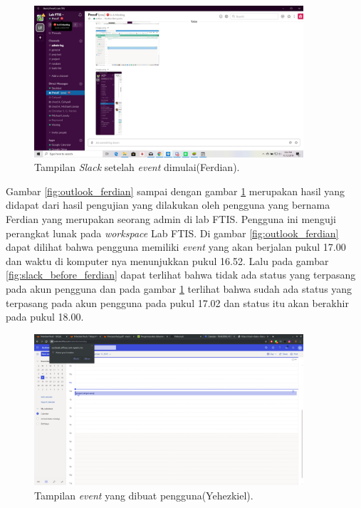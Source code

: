\begin{figure}[h]
  \includegraphics[width=10cm]{./Gambar/PengujianFerdian/Slack_After.jpg}
  \centering
  \caption{Tampilan \textit{Slack} setelah \textit{event} dimulai(Ferdian).}
  \label{fig:slack_after_ferdian}
\end{figure}

Gambar \ref{fig:outlook_ferdian} sampai dengan gambar \ref{fig:slack_after_ferdian} merupakan hasil yang didapat dari hasil pengujian yang dilakukan oleh pengguna yang bernama Ferdian yang merupakan seorang admin di lab FTIS. Pengguna ini menguji perangkat lunak pada \textit{workspace} Lab FTIS. Di gambar \ref{fig:outlook_ferdian} dapat dilihat bahwa pengguna memiliki \textit{event} yang akan berjalan pukul 17.00 dan waktu di komputer nya menunjukkan pukul 16.52. Lalu pada gambar \ref{fig:slack_before_ferdian} dapat terlihat bahwa tidak ada status yang terpasang pada akun pengguna dan pada gambar \ref{fig:slack_after_ferdian} terlihat bahwa sudah ada status yang terpasang pada akun pengguna pada pukul 17.02 dan status itu akan berakhir pada pukul 18.00. 
\clearpage

\begin{figure}[h]
  \includegraphics[width=10cm]{./Gambar/PengujianKikil/Outlook.png}
  \centering
  \caption{Tampilan \textit{event} yang dibuat pengguna(Yehezkiel).}
  \label{fig:outlook_kikil}
\end{figure}

